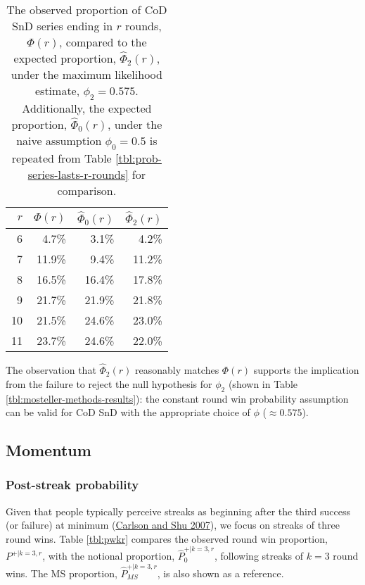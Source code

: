 \documentclass{article}
\begin{document}
\begin{table}

\caption{The observed proportion of CoD SnD series ending in $r$ rounds, $\Phi(r)$, compared to the expected proportion, $\hat{\Phi}_2(r)$, under the maximum likelihood estimate, $\phi_2 = 0.575$. Additionally, the expected proportion, $\hat{\Phi}_0(r)$, under the naive assumption $\phi_0 = 0.5$ is repeated from Table \ref{tbl:prob-series-lasts-r-rounds} for comparison.}

\centering
\begin{tabular}{rrrr}
\toprule
$r$ & $\Phi(r)$ & $\hat{\Phi}_0(r)$ & $\hat{\Phi}_2(r)$ \\
\midrule

6 & 4.7\% & 3.1\% & 4.2\% \\
7 & 11.9\% & 9.4\% & 11.2\% \\
8 & 16.5\% & 16.4\% & 17.8\% \\
9 & 21.7\% & 21.9\% & 21.8\% \\
10 & 21.5\% & 24.6\% & 23.0\% \\
11 & 23.7\% & 24.6\% & 22.0\% \\

\bottomrule
\end{tabular}

\label{tbl:alternative-constant-ps}

\end{table}

The observation that \(\hat{\Phi}_2(r)\) reasonably matches \(\Phi(r)\)
supports the implication from the failure to reject the null hypothesis
for \(\phi_2\) (shown in Table \ref{tbl:mosteller-methods-results}): the
constant round win probability assumption can be valid for CoD SnD with
the appropriate choice of \(\phi\) (\(\approx 0.575\)).

\hypertarget{momentum-1}{%
\subsection{Momentum}\label{momentum-1}}

\hypertarget{post-streak-probability}{%
\subsubsection{Post-streak probability}\label{post-streak-probability}}

Given that people typically perceive streaks as beginning after the
third success (or failure) at minimum
(\protect\hyperlink{ref-carlson2007}{Carlson and Shu 2007}), we focus on
streaks of three round wins. Table \ref{tbl:pwkr} compares the observed
round win proportion, \(P^{+|k=3,r}\), with the notional proportion,
\(\hat{P}^{+|k=3,r}_0\), following streaks of \(k=3\) round wins. The MS
proportion, \(\hat{P}^{+|k=3,r}_{MS}\), is also shown as a reference.
\end{document}
